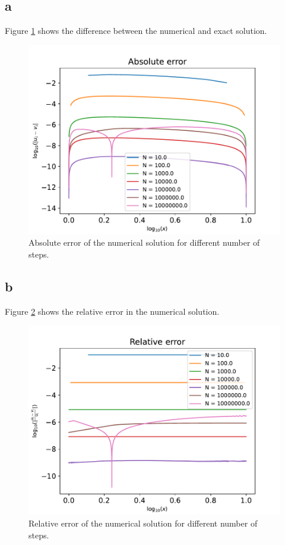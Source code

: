 \documentclass[english,notitlepage]{revtex4-1}  %
\begin{document}
    \subsection*{a}
    Figure \ref{abs_error} shows the difference between the numerical and exact solution.
    \begin{figure}[!ht]
        \centering
        \includegraphics[scale=0.6]{abs_error.pdf}
        \caption{Absolute error of the numerical solution for different number of steps.}
        \label{abs_error}
    \end{figure}

    \newpage
    \subsection*{b}
    Figure \ref{rel_error} shows the relative error in the numerical solution.
    \begin{figure}[!ht]
        \centering
        \includegraphics[scale=0.6]{rel_error.pdf}
        \caption{Relative error of the numerical solution for different number of steps.}
        \label{rel_error}
    \end{figure}
\end{document}
